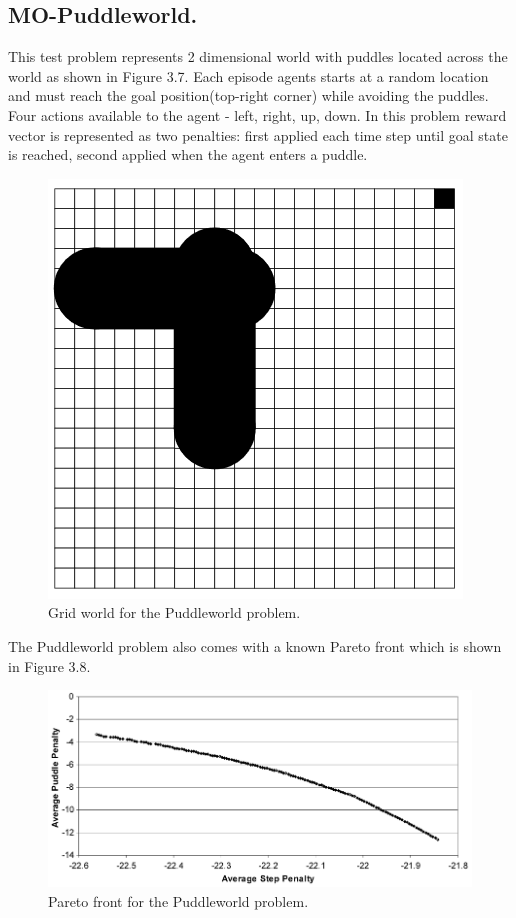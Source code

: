 {{\subsection{MO-Puddleworld.}
This test problem represents 2 dimensional world with puddles located across the world as shown in Figure 3.7. Each episode agents starts at a random location and must reach the goal position(top-right corner) while avoiding the puddles. Four actions available to the agent - left, right, up, down. In this problem reward vector is represented as two penalties: first applied each time step until goal state is reached, second applied when the agent enters a puddle.
\begin{figure}[ht]
\vskip 0.2in
\centering
\includegraphics[scale=0.9]{pw.png}
\caption{Grid world for the Puddleworld problem.}
\label{ParetoDominance}
\end{figure}

The Puddleworld problem also comes with a known Pareto front which is shown in Figure 3.8.
\begin{figure}[ht]
\vskip 0.2in
\centering
\includegraphics[scale=0.9]{pwParetoFront.png}
\caption{Pareto front for the Puddleworld problem.}
\label{ParetoDominance}
\end{figure}

}}
